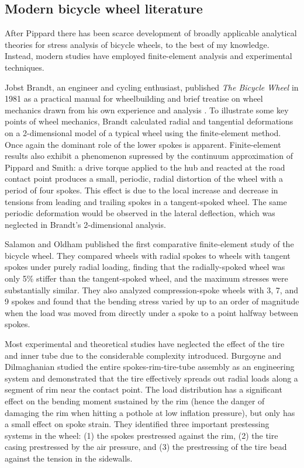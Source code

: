 \documentclass[../thesis.tex]{subfiles}
\begin{document}
\subsection{Modern bicycle wheel literature}

After Pippard there has been scarce development of broadly applicable analytical theories for stress analysis of bicycle wheels, to the best of my knowledge. Instead, modern studies have employed finite-element analysis and experimental techniques.

Jobst Brandt, an engineer and cycling enthusiast, published \emph{The Bicycle Wheel} in 1981 as a practical manual for wheelbuilding and brief treatise on wheel mechanics drawn from his own experience and analysis \cite{Brandt}. To illustrate some key points of wheel mechanics, Brandt calculated radial and tangential deformations on a 2-dimensional model of a typical wheel using the finite-element method. Once again the dominant role of the lower spokes is apparent. Finite-element results also exhibit a phenomenon supressed by the continuum approximation of Pippard and Smith: a drive torque applied to the hub and reacted at the road contact point produces a small, periodic, radial distortion of the wheel with a period of four spokes. This effect is due to the local increase and decrease in tensions from leading and trailing spokes in a tangent-spoked wheel. The same periodic deformation would be observed in the lateral deflection, which was neglected in Brandt's 2-dimensional analysis.

Salamon and Oldham published the first comparative finite-element study of the bicycle wheel. They compared wheels with radial spokes to wheels with tangent spokes under purely radial loading, finding that the radially-spoked wheel was only 5\% stiffer than the tangent-spoked wheel, and the maximum stresses were substantially similar. They also analyzed compression-spoke wheels with 3, 7, and 9 spokes and found that the bending stress varied by up to an order of magnitude when the load was moved from directly under a spoke to a point halfway between spokes.

Most experimental and theoretical studies have neglected the effect of the tire and inner tube due to the considerable complexity introduced. Burgoyne and Dilmaghanian \cite{Burgoyne} studied the entire spokes-rim-tire-tube assembly as an engineering system and demonstrated that the tire effectively spreads out radial loads along a segment of rim near the contact point. The load distribution has a significant effect on the bending moment sustained by the rim (hence the danger of damaging the rim when hitting a pothole at low inflation pressure), but only has a small effect on spoke strain. They identified three important prestessing systems in the wheel: (1) the spokes prestressed against the rim, (2) the tire casing prestressed by the air pressure, and (3) the prestressing of the tire bead against the tension in the sidewalls.
\end{document}
